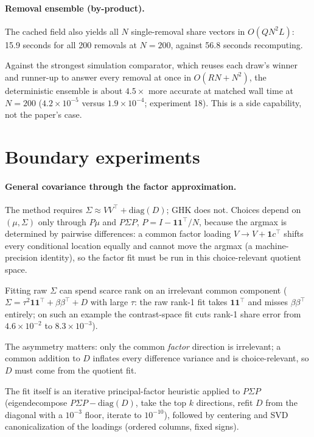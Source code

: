 \documentclass[12pt]{article}
\theoremstyle{remark}
\begin{document}
\paragraph{Removal ensemble (by-product).} The cached field also yields
all $N$ single-removal share vectors in $O(QN^2L)$: 15.9 seconds for all
200 removals at $N=200$, against 56.8 seconds recomputing.

Against the strongest simulation comparator, which reuses each draw's
winner and runner-up to answer every removal at once in $O(RN + N^2)$, the
deterministic ensemble is about $4.5\times$ more accurate at matched wall
time at $N=200$ ($4.2\times10^{-5}$ versus $1.9\times10^{-4}$;
experiment 18). This is a
side capability, not the paper's case.

\section{Boundary experiments}\label{sec:boundary}

\paragraph{General covariance through the factor approximation.} The method
requires $\Sigma \approx VV^\top + \mathrm{diag}(D)$; GHK does not. Choices depend on
$(\mu, \Sigma)$ only through $P\mu$ and $P\Sigma P$, $P = I -
\mathbf{1}\mathbf{1}^\top/N$, because the argmax is determined by
pairwise differences: a common factor loading $V \to V +
\mathbf{1}c^\top$ shifts every conditional location equally and cannot move
the argmax (a machine-precision identity), so the factor fit must be run in
this choice-relevant quotient space.

Fitting raw $\Sigma$ can spend
scarce rank on an irrelevant common component ($\Sigma = \tau^2
\mathbf{1}\mathbf{1}^\top + \beta\beta^\top + D$ with large $\tau$: the
raw rank-1 fit takes $\mathbf{1}\mathbf{1}^\top$ and misses
$\beta\beta^\top$ entirely; on such an example the contrast-space fit cuts
rank-1 share error from $4.6\times10^{-2}$ to $8.3\times10^{-3}$).

The
asymmetry matters: only the common \emph{factor} direction is irrelevant; a
common addition to $D$ inflates every difference variance and is
choice-relevant, so $D$ must come from the quotient fit.

The fit itself is
an iterative principal-factor heuristic applied to $P\Sigma P$ (eigendecompose
$P\Sigma P - \mathrm{diag}(D)$, take the top $k$ directions, refit $D$ from
the diagonal with a $10^{-3}$ floor, iterate to $10^{-10}$), followed by
centering and SVD canonicalization of the loadings (ordered columns, fixed
signs).
\end{document}
